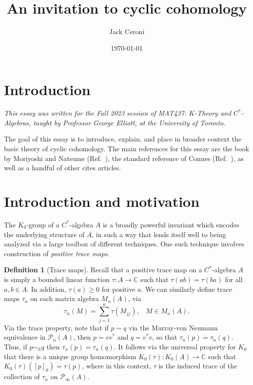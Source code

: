\documentclass[aps,pra,showpacs,notitlepage,onecolumn,superscriptaddress,nofootinbib]{revtex4-1}
\theoremstyle{definition}
\newtheorem{definition}{Definition}[section]
\begin{document}
\title{An invitation to cyclic cohomology}
\author{Jack Ceroni}

\date{\today}

\maketitle

\section{Introduction}

\noindent \emph{This essay was written for the Fall 2023 session of MAT437: $K$-Theory and $C^{*}$-Algebras, taught by Professor George Elliott, at the University of Toronto.}
\newline

\noindent The goal of this essay is to introduce, explain, and place in broader context the basic theory of cyclic cohomology. The main references
for this essay are the book by Moriyoshi and Natsume (Ref.~\cite{}), the standard reference of Connes (Ref.~\cite{}), as well as a handful of other cites articles.

\section{Introduction and motivation}

\noindent The $K_0$-group of a $C^{*}$-algebra $A$ is a broadly powerful invariant which encodes the underlying structure of $A$, in such a way that lends
itself well to being analyzed via a large toolbox of different techniques. One such technique involves construction of \emph{positive trace maps}.

\begin{definition}[Trace maps]
  Recall that a positive trace map on a $C^{*}$-algebra $A$ is simply a bounded linear function $\tau : A \rightarrow \mathbb{C}$ such that $\tau(ab) = \tau(ba)$ for all $a, b \in A$. In addition, $\tau(a) \geq 0$
  for positive $a$. We can similarly define trace maps $\tau_n$ on each matrix algebra $M_n(A)$, via
\begin{equation}
  \tau_n(M) = \displaystyle\sum_{j = 1}^{n} \tau(M_{jj}), \ \ \ \ M \in M_n(A).
\end{equation}
Via the trace property, note that if $p \sim q$ via the Murray-von Neumann equivalence in $\mathcal{P}_n(A)$, then $p = v v^{*}$ and $q = v^{*} v$, so that $\tau_n(p) = \tau_n(q)$. Thus, if $p \sim_h q$
then $\tau_n(p) = \tau_n(q)$. It follows via the universal property for $K_0$ that there is a unique group homomorphism $K_0(\tau) : K_0(A) \rightarrow \mathbb{C}$ such that $K_0(\tau)([p]_0) = \tau(p)$,
where in this context, $\tau$ is the induced trace of the collection of $\tau_n$ on $\mathcal{P}_{\infty}(A)$.
\end{definition}
\end{document}
